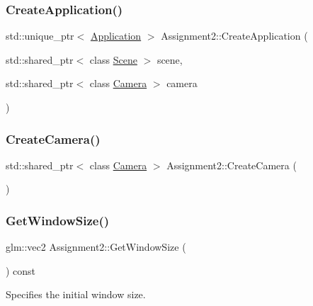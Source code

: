 \subsubsection{\texorpdfstring{Create\+Application()}{CreateApplication()}}
{\footnotesize\ttfamily std\+::unique\+\_\+ptr$<$ \hyperlink{class_application}{Application} $>$ Assignment2\+::\+Create\+Application (\begin{DoxyParamCaption}\item[{std\+::shared\+\_\+ptr$<$ class \hyperlink{class_scene}{Scene} $>$}]{scene,  }\item[{std\+::shared\+\_\+ptr$<$ class \hyperlink{class_camera}{Camera} $>$}]{camera }\end{DoxyParamCaption})\hspace{0.3cm}{\ttfamily [static]}}

\hypertarget{class_assignment2_a285e6d6ff330c03e28e49660ec178fa4}{}\label{class_assignment2_a285e6d6ff330c03e28e49660ec178fa4}
\subsubsection{\texorpdfstring{Create\+Camera()}{CreateCamera()}}
{\footnotesize\ttfamily std\+::shared\+\_\+ptr$<$ class \hyperlink{class_camera}{Camera} $>$ Assignment2\+::\+Create\+Camera (\begin{DoxyParamCaption}{ }\end{DoxyParamCaption})\hspace{0.3cm}{\ttfamily [static]}}

\hypertarget{class_assignment2_a9ea79bd468c12dde5159ca7b8efd8e1e}{}\label{class_assignment2_a9ea79bd468c12dde5159ca7b8efd8e1e}
\subsubsection{\texorpdfstring{Get\+Window\+Size()}{GetWindowSize()}}
{\footnotesize\ttfamily glm\+::vec2 Assignment2\+::\+Get\+Window\+Size (\begin{DoxyParamCaption}{ }\end{DoxyParamCaption}) const\hspace{0.3cm}{\ttfamily [virtual]}}



Specifies the initial window size.

